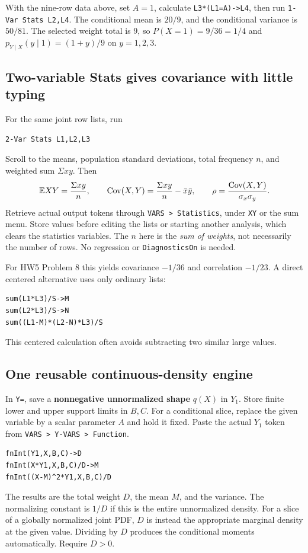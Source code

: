 \begin{example}
With the nine-row data above, set $A=1$, calculate \texttt{L3*(L1=A)->L4}, then run \texttt{1-Var Stats L2,L4}. The conditional mean is $20/9$, and the conditional variance is $50/81$. The selected weight total is 9, so $P(X=1)=9/36=1/4$ and $p_{Y\mid X}(y\mid1)=(1+y)/9$ on $y=1,2,3$.
\end{example}

\subsection{Two-variable Stats gives covariance with little typing}
For the same joint row lists, run
\begin{verbatim}
2-Var Stats L1,L2,L3
\end{verbatim}
Scroll to the means, population standard deviations, total frequency $n$, and weighted sum $\Sigma xy$. Then
\[
\mathbb E XY=\frac{\Sigma xy}{n},\qquad
\operatorname{Cov}(X,Y)=\frac{\Sigma xy}{n}-\bar x\bar y,\qquad
\rho=\frac{\operatorname{Cov}(X,Y)}{\sigma_x\sigma_y}.
\]
Retrieve actual output tokens through \texttt{VARS > Statistics}, under \texttt{XY} or the sum menu. Store values before editing the lists or starting another analysis, which clears the statistics variables. The $n$ here is the \emph{sum of weights}, not necessarily the number of rows. No regression or \texttt{DiagnosticsOn} is needed.

For HW5 Problem 8 this yields covariance $-1/36$ and correlation $-1/23$. A direct centered alternative uses only ordinary lists:
\begin{verbatim}
sum(L1*L3)/S->M
sum(L2*L3)/S->N
sum((L1-M)*(L2-N)*L3)/S
\end{verbatim}
This centered calculation often avoids subtracting two similar large values.

\subsection{One reusable continuous-density engine}
In \texttt{Y=}, save a \textbf{nonnegative unnormalized shape} $q(X)$ in $Y_1$. Store finite lower and upper support limits in $B,C$. For a conditional slice, replace the given variable by a scalar parameter $A$ and hold it fixed. Paste the actual $Y_1$ token from \texttt{VARS > Y-VARS > Function}.
\begin{verbatim}
fnInt(Y1,X,B,C)->D
fnInt(X*Y1,X,B,C)/D->M
fnInt((X-M)^2*Y1,X,B,C)/D
\end{verbatim}
The results are the total weight $D$, the mean $M$, and the variance. The normalizing constant is $1/D$ if this is the entire unnormalized density. For a slice of a globally normalized joint PDF, $D$ is instead the appropriate marginal density at the given value. Dividing by $D$ produces the conditional moments automatically. Require $D>0$.

